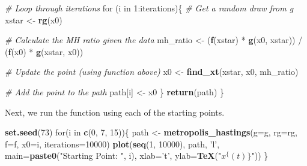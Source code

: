 \documentclass[]{article}
\newenvironment{Shaded}{\begin{snugshade}}{\end{snugshade}}
\newcommand{\KeywordTok}[1]{\textcolor[rgb]{0.13,0.29,0.53}{\textbf{{#1}}}}
\newcommand{\DataTypeTok}[1]{\textcolor[rgb]{0.13,0.29,0.53}{{#1}}}
\newcommand{\DecValTok}[1]{\textcolor[rgb]{0.00,0.00,0.81}{{#1}}}
\newcommand{\StringTok}[1]{\textcolor[rgb]{0.31,0.60,0.02}{{#1}}}
\newcommand{\CommentTok}[1]{\textcolor[rgb]{0.56,0.35,0.01}{\textit{{#1}}}}
\newcommand{\NormalTok}[1]{{#1}}
\begin{document}
\begin{Shaded}
\begin{Highlighting}[]
  \CommentTok{# Loop through iterations}
  \NormalTok{for (i in }\DecValTok{1}\NormalTok{:iterations)\{}
    \CommentTok{# Get a random draw from g}
    \NormalTok{xstar <-}\StringTok{ }\KeywordTok{rg}\NormalTok{(x0)}
    
    \CommentTok{# Calculate the MH ratio given the data}
    \NormalTok{mh_ratio <-}\StringTok{ }\NormalTok{(}\KeywordTok{f}\NormalTok{(xstar) *}\StringTok{ }\KeywordTok{g}\NormalTok{(x0, xstar)) /}\StringTok{ }\NormalTok{(}\KeywordTok{f}\NormalTok{(x0) *}\StringTok{ }\KeywordTok{g}\NormalTok{(xstar, x0))}
    
    \CommentTok{# Update the point (using function above)}
    \NormalTok{x0 <-}\StringTok{ }\KeywordTok{find_xt}\NormalTok{(xstar, x0, mh_ratio)}
    
    \CommentTok{# Add the point to the path}
    \NormalTok{path[i] <-}\StringTok{ }\NormalTok{x0}
  \NormalTok{\}}
  \KeywordTok{return}\NormalTok{(path)}
\NormalTok{\}}
\end{Highlighting}
\end{Shaded}

Next, we run the function using each of the starting points.

\begin{Shaded}
\begin{Highlighting}[]
\KeywordTok{set.seed}\NormalTok{(}\DecValTok{73}\NormalTok{)}
\NormalTok{for(i in }\KeywordTok{c}\NormalTok{(}\DecValTok{0}\NormalTok{, }\DecValTok{7}\NormalTok{, }\DecValTok{15}\NormalTok{))\{}
  \NormalTok{path <-}\StringTok{ }\KeywordTok{metropolis_hastings}\NormalTok{(}\DataTypeTok{g=}\NormalTok{g, }\DataTypeTok{rg=}\NormalTok{rg, }\DataTypeTok{f=}\NormalTok{f, }\DataTypeTok{x0=}\NormalTok{i, }\DataTypeTok{iterations=}\DecValTok{10000}\NormalTok{)}
  \KeywordTok{plot}\NormalTok{(}\KeywordTok{seq}\NormalTok{(}\DecValTok{1}\NormalTok{, }\DecValTok{10000}\NormalTok{), path, }\StringTok{'l'}\NormalTok{, }\DataTypeTok{main=}\KeywordTok{paste0}\NormalTok{(}\StringTok{"Starting Point: "}\NormalTok{, i), }
       \DataTypeTok{xlab=}\StringTok{'t'}\NormalTok{, }\DataTypeTok{ylab=}\KeywordTok{TeX}\NormalTok{(}\StringTok{"$x^\{(t)\}$"}\NormalTok{))}
\NormalTok{\}}
\end{Highlighting}
\end{Shaded}
\end{document}
